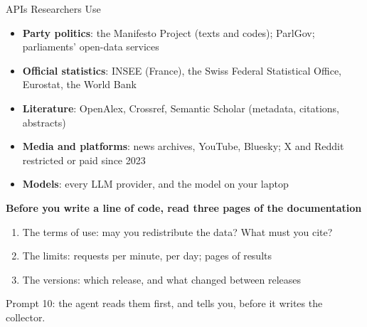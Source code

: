 \begin{frame}{APIs Researchers Use}

\small
\begin{itemize}
    \setlength{\itemsep}{3pt}
    \item \textbf{Party politics}: the Manifesto Project (texts and codes); ParlGov; parliaments' open-data services
    \item \textbf{Official statistics}: INSEE (France), the Swiss Federal Statistical Office, Eurostat, the World Bank
    \item \textbf{Literature}: OpenAlex, Crossref, Semantic Scholar (metadata, citations, abstracts)
    \item \textbf{Media and platforms}: news archives, YouTube, Bluesky; X and Reddit restricted or paid since 2023
    \item \textbf{Models}: every LLM provider, and the model on your laptop
\end{itemize}

\vspace{0.25cm}

\textbf{Before you write a line of code, read three pages of the documentation}
\begin{enumerate}
    \setlength{\itemsep}{2pt}
    \item The terms of use: may you redistribute the data? What must you cite?
    \item The limits: requests per minute, per day; pages of results
    \item The versions: which release, and what changed between releases
\end{enumerate}

\vspace{0.15cm}
{\footnotesize Prompt 10: the agent reads them first, and tells you, before it writes the collector.}

\end{frame}

